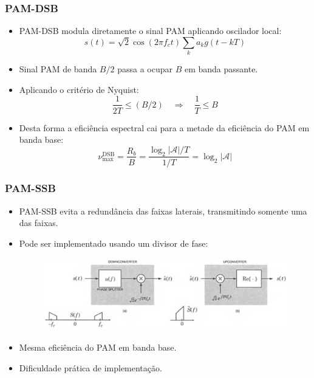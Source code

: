 \begin{frame}
	\frametitle{PAM-DSB}

	\begin{itemize}
	  \item PAM-DSB modula diretamente o sinal PAM aplicando oscilador local:
	  \begin{equation*}
	      s(t) = \sqrt{2} \cos(2\pi f_c t) \sum_k a_k g(t-kT)
	  \end{equation*}
	  \item Sinal PAM de banda $B/2$ passa a ocupar $B$ em banda passante.
	  \item Aplicando o critério de Nyquist:
	  \begin{equation*}
	      \frac{1}{2T} \leq (B/2) \quad \Longrightarrow \quad \frac{1}{T} \leq B
	  \end{equation*}
	  \item Desta forma a eficiência espectral cai para a metade da eficiência do PAM em banda base:
	  \begin{equation*}
	      \nu_{\text{max}}^{\text{DSB}} = \frac{R_b}{B} = \frac{\log_2 |\mathcal{A}|/T}{1/T} = \log_2 |\mathcal{A}|
	  \end{equation*}
	\end{itemize}
\end{frame}

\begin{frame}
	\frametitle{PAM-SSB}

	\begin{itemize}
	  \item PAM-SSB evita a redundância das faixas laterais, transmitindo somente uma das faixas.
	  \item Pode ser implementado usando um divisor de fase:
	  \begin{figure}[t]	
	    \begin{center}
	      \includegraphics[width=0.9\columnwidth]{figs/pam_22}
	    \end{center}
	  \end{figure}
	  \item Mesma eficiência do PAM em banda base.
	  \item Dificuldade prática de implementação.
	\end{itemize}
	
\end{frame}

